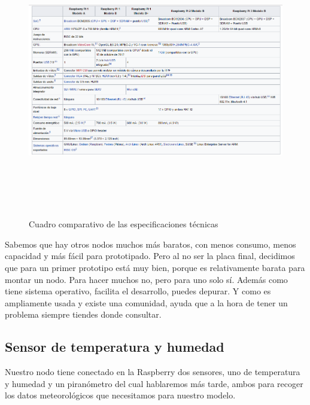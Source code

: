  \begin{figure}[htb]
	
	\begin{center}
		\includegraphics[width=17cm,height=12cm]{figures/Cuadro_Tipos_Raspberry.png}
		\caption{Cuadro comparativo de las especificaciones técnicas}
	\end{center}
	
	\label{types}
\end{figure}


Sabemos que hay otros nodos muchos más baratos, con menos consumo, menos capacidad y más fácil para prototipado. Pero al no ser la placa final, decidimos que para un primer prototipo está muy bien, porque es relativamente barata para montar un nodo. Para hacer muchos no, pero para uno solo sí. Además como tiene sistema operativo, facilita el desarrollo, puedes depurar. Y como es ampliamente usada y existe una comunidad, ayuda que a la hora de tener un problema siempre tiendes donde consultar.

\subsection{Sensor de temperatura y humedad}

Nuestro nodo tiene conectado en la Raspberry dos sensores, uno de temperatura y humedad y un piranómetro del cual hablaremos más tarde, ambos para recoger los datos meteorológicos que necesitamos para nuestro modelo.

